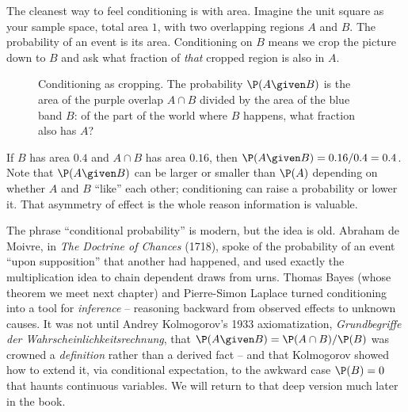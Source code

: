 The cleanest way to feel conditioning is with area. Imagine the unit square as your sample space, total area $1$, with two overlapping regions $A$ and $B$. The probability of an event is its area. Conditioning on $B$ means we crop the picture down to $B$ and ask what fraction of \emph{that} cropped region is also in $A$.

\begin{figure}[H]
\centering
{}
\caption{Conditioning as cropping. The probability $\P(A\given B)$ is the area of the purple overlap $A\cap B$ divided by the area of the blue band $B$: of the part of the world where $B$ happens, what fraction also has $A$?}
\label{ch04:fig-square}
\end{figure}

If $B$ has area $0.4$ and $A\cap B$ has area $0.16$, then $\P(A\given B) = 0.16/0.4 = 0.4$. Note that $\P(A\given B)$ can be larger or smaller than $\P(A)$ depending on whether $A$ and $B$ ``like'' each other; conditioning can raise a probability or lower it. That asymmetry of effect is the whole reason information is valuable.

\begin{historybox}
The phrase ``conditional probability'' is modern, but the idea is old. Abraham de Moivre, in \emph{The Doctrine of Chances} (1718), spoke of the probability of an event ``upon supposition'' that another had happened, and used exactly the multiplication idea to chain dependent draws from urns. Thomas Bayes (whose theorem we meet next chapter) and Pierre-Simon Laplace turned conditioning into a tool for \emph{inference} -- reasoning backward from observed effects to unknown causes. It was not until Andrey Kolmogorov's 1933 axiomatization, \emph{Grundbegriffe der Wahrscheinlichkeitsrechnung}, that $\P(A\given B) = \P(A\cap B)/\P(B)$ was crowned a \emph{definition} rather than a derived fact -- and that Kolmogorov showed how to extend it, via conditional expectation, to the awkward case $\P(B)=0$ that haunts continuous variables. We will return to that deep version much later in the book.
\end{historybox}

